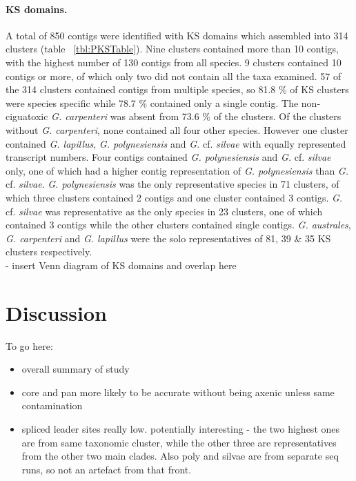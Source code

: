 \documentclass[12pt]{article}
\begin{document}
\paragraph*{KS domains.}
A total of 850 contigs were identified with KS domains which assembled into 314 clusters (table ~\ref{tbl:PKSTable}). 
Nine clusters contained more than 10 contigs, with the highest number of 130 contigs from all species.
9 clusters contained 10 contigs or more, of which only two did not contain all the taxa examined.
57 of the 314 clusters contained contigs from multiple species, so 81.8 \% of KS clusters were species specific while 78.7 \% contained only a single contig. 
The non-ciguatoxic \textit{G. carpenteri} was absent from 73.6 \% of the clusters. 
Of the clusters without \textit{G. carpenteri}, none contained all four other species. 
However one cluster contained \textit{G. lapillus}, \textit{G. polynesiensis} and \emph{G.} cf. \emph{silvae} with equally represented transcript numbers. 
Four contigs contained \textit{G. polynesiensis} and \emph{G.} cf. \emph{silvae} only, one of which had a higher contig representation of \textit{G. polynesiensis} than \emph{G.} cf. \emph{silvae}. 
\textit{G. polynesiensis} was the only representative species in 71 clusters, of which three clusters contained 2 contigs and one cluster contained 3 contigs. 
\emph{G.} cf. \emph{silvae} was representative as the only species in 23 clusters, one of which contained 3 contigs while the other clusters contained single contigs.
\textit{G. australes}, \textit{G. carpenteri} and \textit{G. lapillus} were the solo representatives of 81, 39 \& 35 KS clusters respectively. \\
- insert Venn diagram of KS domains and overlap here
\section*{Discussion}
To go here:
\begin{itemize}
\item overall summary of study
\item core and pan more likely to be accurate without being axenic unless same contamination
\item spliced leader sites really low. potentially interesting - the two highest ones are from same taxonomic cluster, while the other three are representatives from the other two main clades. Also poly and silvae are from separate seq runs, so not an artefact from that front.
\end{itemize}
\end{document}
